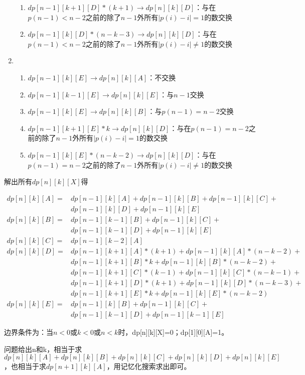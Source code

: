 \documentclass[a4paper]{ctexart}
\begin{document}
\begin{enumerate}[A]
\begin{enumerate}
			\item $dp[n-1][k+1][D]*(k+1)\rightarrow dp[n][k][D]$：与在$p(n-1)<n-2$之前的除了$n-1$外所有$|p(i)-i|=1$的数交换
			\item $dp[n-1][k][D]*(n-k-3)\rightarrow dp[n][k][D]$：与在$p(n-1)<n-2$之前的除了$n-1$外所有$|p(i)-i|\neq 1$的数交换
		\end{enumerate}
		\item \begin{enumerate}
			\item $dp[n-1][k][E]\rightarrow dp[n][k][A]$：不交换
			\item $dp[n-1][k-1][E]\rightarrow dp[n][k][E]$：与$n-1$交换
			\item $dp[n-1][k][E]\rightarrow dp[n][k][B]$：与$p(n-1)=n-2$交换
			\item $dp[n-1][k+1][E]*k\rightarrow dp[n][k][D]$：与在$p(n-1)=n-2$之前的除了$n-1$外所有$|p(i)-i|=1$的数交换
			\item $dp[n-1][k][E]*(n-k-2)\rightarrow dp[n][k][D]$：与在$p(n-1)=n-2$之前的除了$n-1$外所有$|p(i)-i|\neq 1$的数交换
		\end{enumerate}
	\end{enumerate}

	解出所有$dp[n][k][X]$得

	$\begin{aligned}
		dp[n][k][A]=&dp[n-1][k][A]+dp[n-1][k][B]+dp[n-1][k][C]+\\
		&dp[n-1][k][D]+dp[n-1][k][E]\\
		dp[n][k][B]=&dp[n-1][k-1][B]+dp[n-1][k][C]+\\
		&dp[n-1][k-1][D]+dp[n-1][k][E]\\
		dp[n][k][C]=&dp[n-1][k-2][A]\\
		dp[n][k][D]=&dp[n-1][k+1][A]*(k+1)+dp[n-1][k][A]*(n-k-2)+\\
		&dp[n-1][k+1][B]*k+dp[n-1][k][B]*(n-k-2)+\\
		&dp[n-1][k+1][C]*(k-1)+dp[n-1][k][C]*(n-k-1)+\\
		&dp[n-1][k+1][D]*(k+1)+dp[n-1][k][D]*(n-k-3)+\\
		&dp[n-1][k+1][E]*k+dp[n-1][k][E]*(n-k-2)\\
		dp[n][k][E]=&dp[n-1][k][B]+dp[n-1][k][C]+\\
		&dp[n-1][k-1][D]+dp[n-1][k-1][E]
	\end{aligned}$

	边界条件为：当$n<0$或$k<0$或$n<k$时，dp[n][k][X]=0；dp[1][0][A]=1。

	问题给出n和k，相当于求$dp[n][k][A]+dp[n][k][B]+dp[n][k][C]+dp[n][k][D]+dp[n][k][E]$，也相当于求$dp[n+1][k][A]$，用记忆化搜索求出即可。
\end{document}
